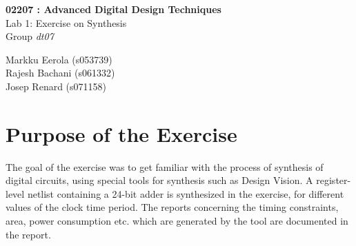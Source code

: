 \documentclass[11pt,a4paper]{article}
\begin{document}
	

\begin{titlepage}

\thispagestyle{fancy}
\lhead{}
\rhead{}
\rule{0pt}{50pt}
\vspace{3cm}

\begin{center}

 	\huge{\textbf{02207 : Advanced Digital Design Techniques}}\\
 	\vspace{1cm}
 	\huge{Lab 1: Exercise on Synthesis}\\
 	\vspace{1cm}
 	\huge{Group \textit{dt07}}\\	
\end{center}

\vspace{4cm}

\begin{flushright}
	\LARGE{Markku Eerola (s053739)}\\
	\vspace{0.3cm}
	\LARGE{Rajesh Bachani (s061332)}\\
	\vspace{0.3cm}
	\LARGE{Josep Renard (s071158)}\\
\end{flushright}
\cfoot{\today}
\end{titlepage}


\newpage 
\tableofcontents

\newpage 
\section{Purpose of the Exercise}

The goal of the exercise was to get familiar with the process of synthesis of digital circuits, using special tools for synthesis such as Design Vision. A register-level netlist containing a 24-bit adder is synthesized in the exercise, for different values of the clock time period. The reports concerning the timing constraints, area, power consumption etc. which are generated by the tool are documented in the report.
\end{document}
